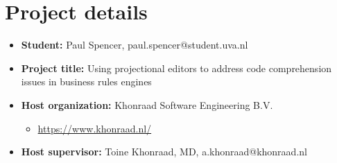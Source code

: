 \section{Project details}

\begin{itemize}[topsep=2pt,itemsep=2pt,partopsep=2pt, parsep=2pt]
    \item \textbf{Student:} Paul Spencer, paul.spencer@student.uva.nl
    \item \textbf{Project title:} Using projectional editors to address code comprehension issues in business rules engines
    \item \textbf{Host organization:} Khonraad Software Engineering B.V. 
    \begin{itemize}[topsep=2pt,itemsep=2pt,partopsep=2pt, parsep=2pt]
        \item \url{https://www.khonraad.nl/}
    \end{itemize}
    \item \textbf{Host supervisor:} Toine Khonraad, MD, a.khonraad@khonraad.nl
\end{itemize}
